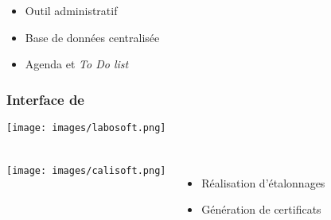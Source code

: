 \begin{frame} 
    \frametitle{\labo}
    \begin{itemize}
        \item<2> Outil administratif
        \item<2> Base de données centralisée
        \item<2> Agenda et \textit{To Do list}
    \end{itemize}
\end{frame}
\begin{frame}
    \frametitle{Interface de \labo}
    \texttt{[image: images/labosoft.png]}
\end{frame}

\begin{frame}
    \frametitle{\cali}
    \begin{columns}
        \texttt{[image: images/calisoft.png]}

        \begin{itemize}
            \item Réalisation d'étalonnages
            \item Génération de certificats
        \end{itemize}
    \end{columns}
\end{frame}